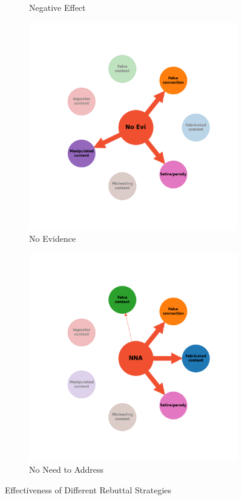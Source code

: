 \documentclass[twocolumn]{article}
\begin{document}
\begin{figure}
\begin{subfigure}{0.28\textwidth}
    \caption{Negative Effect}
    \label{fig:rebuttal_negeff}
\end{subfigure}
\hfill
\begin{subfigure}{0.28\textwidth}
    \includegraphics[width=\textwidth]{rebuttal_No_Evi.png}
    \caption{No Evidence}
    \label{fig:rebuttal_noevi}
\end{subfigure}

\begin{subfigure}{0.28\textwidth}
    \includegraphics[width=\textwidth]{rebuttal_NNA.png}
    \caption{No Need to Address}
    \label{fig:rebuttal_noneed}
\end{subfigure}

\caption{Effectiveness of Different Rebuttal Strategies}
\label{fig:rebuttals_combined}
\end{figure}
\end{document}

